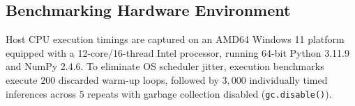 \subsection{Benchmarking Hardware Environment}
Host CPU execution timings are captured on an AMD64 Windows 11 platform equipped with a 12-core/16-thread Intel processor, running 64-bit Python 3.11.9 and NumPy 2.4.6. To eliminate OS scheduler jitter, execution benchmarks execute $200$ discarded warm-up loops, followed by $3,000$ individually timed inferences across $5$ repeats with garbage collection disabled (\texttt{gc.disable()}).
